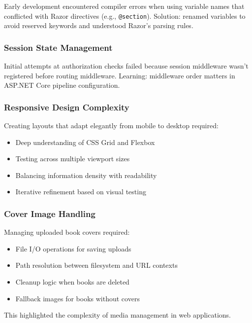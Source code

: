 \documentclass[12pt,a4paper]{article}
\begin{document}
Early development encountered compiler errors when using variable names that conflicted with Razor directives (e.g., \texttt{@section}). Solution: renamed variables to avoid reserved keywords and understood Razor's parsing rules.

\subsubsection{Session State Management}

Initial attempts at authorization checks failed because session middleware wasn't registered before routing middleware. Learning: middleware order matters in ASP.NET Core pipeline configuration.

\subsubsection{Responsive Design Complexity}

Creating layouts that adapt elegantly from mobile to desktop required:

\begin{itemize}[leftmargin=*]
    \item Deep understanding of CSS Grid and Flexbox
    \item Testing across multiple viewport sizes
    \item Balancing information density with readability
    \item Iterative refinement based on visual testing
\end{itemize}

\subsubsection{Cover Image Handling}

Managing uploaded book covers required:

\begin{itemize}[leftmargin=*]
    \item File I/O operations for saving uploads
    \item Path resolution between filesystem and URL contexts
    \item Cleanup logic when books are deleted
    \item Fallback images for books without covers
\end{itemize}

This highlighted the complexity of media management in web applications.
\end{document}
